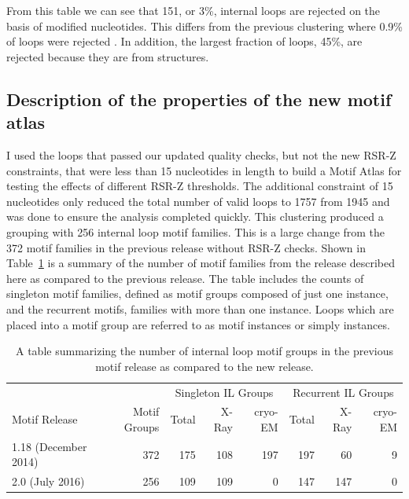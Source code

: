From this table we can see that 151, or 3\%, internal loops are rejected on the
basis of modified nucleotides. This differs from the previous clustering where
0.9\% of loops were rejected \cite{Petrov2012}. In addition, the largest
fraction of loops, 45\%, are rejected because they are from \cyem{} structures.

\subsection{Description of the properties of the new motif atlas}

I used the loops that passed our updated quality checks, but not the new RSR-Z
constraints, that were less than 15 nucleotides in length to build a Motif Atlas
for testing the effects of different RSR-Z thresholds. The additional constraint
of 15 nucleotides only reduced the total number of valid loops to 1757 from 1945
and was done to ensure the analysis completed quickly. This clustering produced
a grouping with 256 internal loop motif families. This is a large change from
the 372 motif families in the previous release without RSR-Z checks. Shown in
Table~\ref{tab:loop-counts} is a summary of the number of motif families from
the release described here as compared to the previous release. The table
includes the counts of singleton motif families, defined as motif groups
composed of just one instance, and the recurrent motifs, families with more than
one instance. Loops which are placed into a motif group are referred to as motif
instances or simply instances.

\begin{table}
  \begin{tabular}{lrrrrrrr}
    \toprule
                  &                                      & \multicolumn{3}{c}{Singleton IL Groups} & \multicolumn{3}{c}{Recurrent IL Groups} \\
    \cmidrule(r){3-5} \cmidrule(r){6-8}
    Motif Release &
      Motif Groups &
      Total & X-Ray & cryo-EM &
      Total & X-Ray & cryo-EM \\
    \midrule
    1.18 (December 2014) & 372 & 175 & 108 & 197 & 197 & 60  & 9 \\
    2.0 (July 2016)      & 256 & 109 & 109 & 0   & 147 & 147 & 0 \\
    \bottomrule
  \end{tabular}
  \caption{A table summarizing the number of internal loop motif groups in the
  previous motif release as compared to the new release. }
  \label{tab:loop-counts}
\end{table}

